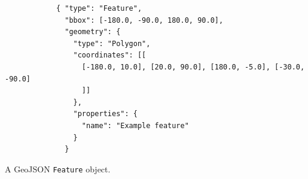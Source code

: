 \begin{listing}\centering
  \begin{minipage}{.8\textwidth}
    \begin{verbatim}
	        { "type": "Feature",
	          "bbox": [-180.0, -90.0, 180.0, 90.0],
	          "geometry": {
	            "type": "Polygon",
	            "coordinates": [[
	              [-180.0, 10.0], [20.0, 90.0], [180.0, -5.0], [-30.0, -90.0]
	              ]]
	            },
	            "properties": {
	              "name": "Example feature"
	            }
	          }
    \end{verbatim}
  \end{minipage}
  \caption{A GeoJSON \texttt{Feature} object.}\label{lst:geojson2}
\end{listing}




